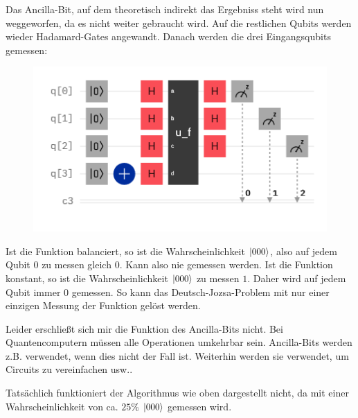 \documentclass[10pt,aps,prb,twocolumn, nofootinbib]{revtex4-2}
\begin{document}
Das Ancilla-Bit, auf dem theoretisch indirekt das Ergebniss steht wird nun weggeworfen, da es nicht
weiter  gebraucht wird. Auf die restlichen Qubits werden wieder Hadamard-Gates angewandt. Danach werden
die drei Eingangsqubits gemessen:
\begin{figure}[h]
    \includegraphics[scale=0.5]{hadamard02}
\end{figure}

Ist die Funktion balanciert, so ist die Wahrscheinlichkeit $\ket{000}$\cite{Deutsch-Jozsa:2}, also auf
jedem Qubit $0$ zu messen gleich $0$. Kann also nie gemessen werden. Ist die Funktion konstant, so ist
die Wahrscheinlichkeit $\ket{000}$ zu messen $1$\cite{Deutsch-Jozsa:2}. Daher wird auf jedem Qubit immer
$0$ gemessen. So kann das Deutsch-Jozsa-Problem mit nur einer einzigen Messung der Funktion gel\"ost
werden.

Leider erschließt sich mir die Funktion des Ancilla-Bits nicht. Bei Quantencomputern müssen alle
Operationen umkehrbar sein. Ancilla-Bits werden z.B. verwendet, wenn dies nicht der Fall 
ist\cite{Ancilla:1}. Weiterhin werden sie verwendet, um Circuits zu vereinfachen usw.\cite{Ancilla:1}.

Tats\"achlich funktioniert der Algorithmus wie oben dargestellt nicht, da mit einer Wahrscheinlichkeit
von ca. $25\%$ $\ket{000}$ gemessen wird.
\end{document}
